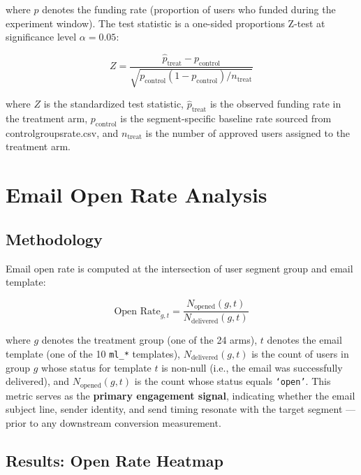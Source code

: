 \documentclass[12pt,a4paper]{article}
\newcommand{\colname}[1]{{\ttfamily\renewcommand{\_}{\textunderscore\allowbreak}#1}}
\begin{document}
where $p$ denotes the funding rate (proportion of users who funded during the
experiment window). The test statistic is a one-sided proportions Z-test at
significance level $\alpha = 0.05$:

\begin{equation}
  Z = \frac{\hat{p}_{\text{treat}} - p_{\text{control}}}%
      {\sqrt{p_{\text{control}}(1 - p_{\text{control}}) / n_{\text{treat}}}}
\end{equation}

\noindent where $Z$ is the standardized test statistic, $\hat{p}_{\text{treat}}$ is the
observed funding rate in the treatment arm, $p_{\text{control}}$ is the segment-specific
baseline rate sourced from \colname{control\_groups\_rate.csv}, and $n_{\text{treat}}$ is
the number of approved users assigned to the treatment arm.

\clearpage
\section{Email Open Rate Analysis}

\subsection{Methodology}

Email open rate is computed at the intersection of user segment group and email template:

\begin{equation}
  \text{Open Rate}_{g,t} = \frac{N_{\text{opened}}(g,t)}{N_{\text{delivered}}(g,t)}
\end{equation}

\noindent where $g$ denotes the treatment group (one of the 24 arms), $t$ denotes
the email template (one of the 10 \texttt{ml\_*} templates),
$N_{\text{delivered}}(g,t)$ is the count of users in group $g$ whose status for
template $t$ is non-null (i.e., the email was successfully delivered), and
$N_{\text{opened}}(g,t)$ is the count whose status equals \texttt{`open'}. This
metric serves as the \textbf{primary engagement signal}, indicating whether the email
subject line, sender identity, and send timing resonate with the target segment —
prior to any downstream conversion measurement.

\subsection{Results: Open Rate Heatmap}
\end{document}
